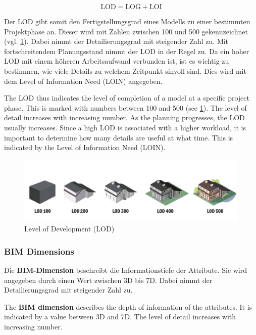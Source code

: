     \begin{equation}
        \text{LOD} = \text{LOG} + \text{LOI}
    \end{equation}
    
 \begin{German}   
    Der LOD gibt somit den Fertigstellungsgrad eines Modells zu einer bestimmten Projektphase an. Dieser wird mit Zahlen zwischen 100 und 500 gekennzeichnet (vgl. \ref{fig:Level_of_Development}). Dabei nimmt der Detailierungsgrad mit steigender Zahl zu. Mit fortschreitendem Planungsstand nimmt der LOD in der Regel zu. Da ein hoher LOD mit einem höheren Arbeitsaufwand verbunden ist, ist es wichtig zu bestimmen, wie viele Details zu welchem Zeitpunkt sinvoll sind. Dies wird mit dem Level of Information Need (LOIN) angegeben. \cite{astourLehrbuchGrundlagenBIMArbeitsmethode2022}
\end{German}
\begin{English}
    The LOD thus indicates the level of completion of a model at a specific project phase. This is marked with numbers between 100 and 500 (see \ref{fig:Level_of_Development}). The level of detail increases with increasing number. As the planning progresses, the LOD usually increases. Since a high LOD is associated with a higher workload, it is important to determine how many details are useful at what time. This is indicated by the Level of Information Need (LOIN). \cite{astourLehrbuchGrundlagenBIMArbeitsmethode2022}
\end{English}

    \begin{figure}[h]
        \centering
        \includegraphics[width=1\textwidth]{images/bim_levels_of_development.png}
        \caption{Level of Development (LOD) \cite{ncircletechBIMLevelDevelopment}}
        \label{fig:Level_of_Development}
    \end{figure}

\subsubsection{BIM Dimensions}
\begin{German}
    Die \textbf{BIM-Dimension} beschreibt die Informationstiefe der Attribute. Sie wird angegeben durch einen Wert zwischen 3D bis 7D. Dabei nimmt der Detailierungsgrad mit steigender Zahl zu. \cite{mayBIMImImmobilienbetrieb2022}
\end{German}
\begin{English}
    The \textbf{BIM dimension} describes the depth of information of the attributes. It is indicated by a value between 3D and 7D. The level of detail increases with increasing number. \cite{mayBIMImImmobilienbetrieb2022}
\end{English}

